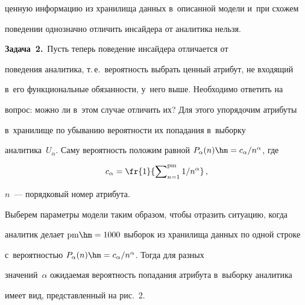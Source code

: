 ценную информацию из хранилища данных в~описанной модели и~при схожем 


поведении однозначно отличить инсайдера от аналитика нельзя.


  


  \smallskip


  


  \noindent


  \textbf{Задача~2.}\ Пусть теперь поведение инсайдера отличается от 


поведения аналитика, т.\,е.\ вероятность выбрать ценный атрибут, не входящий 


в~его функциональные обязанности, у~него выше. Необходимо ответить на 


вопрос: можно ли в~этом случае отличить их? Для этого упорядочим атрибуты 


в~хранилище по убыванию вероятности их попадания в~выборку 


аналитика~$U_\alpha$. Саму вероятность положим равной $P_\alpha(n)\hm= 


c_\alpha/n^\alpha$, где 





\noindent


  $$


  c_\alpha=  \fr{1}{\sum\nolimits_{n=1}^{\mathrm{pm}} {1}/{n^\alpha}}\,,


  $$


$n$~---  порядковый номер атрибута.





  Выберем параметры модели таким образом, чтобы отразить ситуацию, когда 


аналитик делает $\mathrm{pm}\hm=1000$ выборок из хранилища данных по одной строке 


с~вероятностью $P_\alpha(n)\hm= c_\alpha/n^\alpha$. Тогда для разных 


значений~$\alpha$ ожидаемая вероятность попадания атрибута в~выборку аналитика 


имеет вид, представленный на рис.~2.





